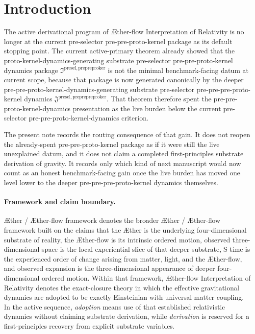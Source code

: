 \documentclass[11pt]{article}
\newcommand{\Aether}{\AE{}ther}
\newcommand{\Aflow}{\AE{}ther-flow}
\newcommand{\TheoryName}{\Aflow{} Interpretation of Relativity}
\newcommand{\TheoryProgram}{\Aether{} / \Aflow{} framework}
\newcommand{\PrePrePreProtoKernelPackage}{\mathfrak J^{\mathrm{presel,preprepreproker}}}
\newcommand{\PrePreProtoKernelPackage}{\mathfrak I^{\mathrm{presel,prepreproker}}}
\begin{document}
\section{Introduction}

The active derivational program of \TheoryName{} is no longer at the current pre-selector pre-pre-proto-kernel package as its default stopping point. The current active-primary theorem already showed that the proto-kernel-dynamics-generating substrate pre-selector pre-pre-proto-kernel dynamics package \(\PrePreProtoKernelPackage\) is not the minimal benchmark-facing datum at current scope, because that package is now generated canonically by the deeper pre-pre-proto-kernel-dynamics-generating substrate pre-selector pre-pre-pre-proto-kernel dynamics \(\PrePrePreProtoKernelPackage\). That theorem therefore spent the pre-pre-proto-kernel-dynamics presentation as the live burden below the current pre-selector pre-pre-proto-kernel-dynamics criterion.

The present note records the routing consequence of that gain. It does not reopen the already-spent pre-pre-proto-kernel package as if it were still the live unexplained datum, and it does not claim a completed first-principles substrate derivation of gravity. It records only which kind of next manuscript would now count as an honest benchmark-facing gain once the live burden has moved one level lower to the deeper pre-pre-pre-proto-kernel dynamics themselves.

\paragraph{Framework and claim boundary.}
\TheoryProgram{} denotes the broader \Aether{} / \Aflow{} framework built on the claims that the \Aether{} is the underlying four-dimensional substrate of reality, the \Aflow{} is its intrinsic ordered motion, observed three-dimensional space is the local experiential slice of that deeper substrate, S-time is the experienced order of change arising from matter, light, and the \Aflow{}, and observed expansion is the three-dimensional appearance of deeper four-dimensional ordered motion. Within that framework, \TheoryName{} denotes the exact-closure theory in which the effective gravitational dynamics are adopted to be exactly Einsteinian with universal matter coupling. In the active sequence, \emph{adoption} means use of that established relativistic dynamics without claiming substrate derivation, while \emph{derivation} is reserved for a first-principles recovery from explicit substrate variables.
\end{document}
